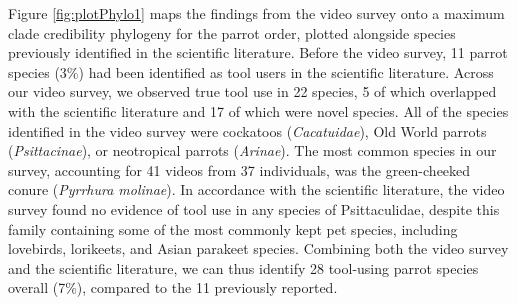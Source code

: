 \documentclass[
  man, donotrepeattitle,floatsintext]{apa6}
\begin{document}
Figure \ref{fig:plotPhylo1} maps the findings from the video survey onto a
maximum clade credibility phylogeny for the parrot order, plotted alongside
species previously identified in the scientific literature. Before the video
survey, 11 parrot species (3\%) had been identified as tool users in the
scientific literature. Across our video survey, we observed true tool use in
22
species, 5 of which overlapped with the scientific literature and
17
of which were novel species. All of the species identified in the video survey
were cockatoos (\emph{Cacatuidae}), Old World parrots (\emph{Psittacinae}), or neotropical
parrots (\emph{Arinae}). The most common species in our survey, accounting for
41 videos from
37
individuals, was the green-cheeked conure (\emph{Pyrrhura molinae}). In accordance
with the scientific literature, the video survey found no evidence of tool use
in any species of Psittaculidae, despite this family containing some of the most
commonly kept pet species, including lovebirds, lorikeets, and Asian parakeet
species. Combining both the video survey and the scientific literature, we can
thus identify 28 tool-using parrot species overall (7\%), compared to the 11
previously reported.
\end{document}
